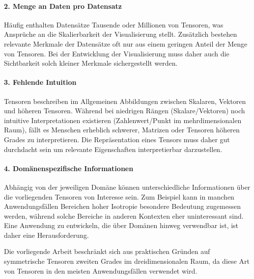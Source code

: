 \documentclass[a4paper,fontsize=12pt,toc=bib,parskip=half,ngerman]{scrartcl}
\begin{document}
\paragraph{2. Menge an Daten pro Datensatz}
H\"aufig enthalten Datens\"atze Tausende oder Millionen von Tensoren, was Anspr\"uche an die Skalierbarkeit der Visualisierung stellt. Zus\"atzlich bestehen relevante Merkmale der Datens\"atze oft nur aus einem geringen Anteil der Menge von Tensoren. Bei der Entwicklung der Visualisierung muss daher auch die Sichtbarkeit solch kleiner Merkmale sichergestellt werden.

\paragraph{3. Fehlende Intuition}
Tensoren beschreiben im Allgemeinen Abbildungen zwischen Skalaren, Vektoren und h\"oheren Tensoren. W\"ahrend bei niedrigen R\"angen (Skalare/Vektoren) noch intuitive Interpretationen existieren (Zahlenwert/Punkt im mehrdimensionalen Raum), f\"allt es Menschen erheblich schwerer, Matrizen oder Tensoren h\"oheren Grades zu interpretieren. Die Repr\"asentation eines Tensors muss daher gut durchdacht sein um relevante Eigenschaften interpretierbar darzustellen.

\paragraph{4. Dom\"anenspezifische Informationen}
Abh\"angig von der jeweiligen Dom\"ane k\"onnen unterschiedliche Informationen \"uber die vorliegenden Tensoren von Interesse sein.  Zum Beispiel kann in manchen Anwendungsf\"allen Bereichen hoher Isotropie besondere Bedeutung zugemessen werden, w\"ahrend solche Bereiche in anderen Kontexten eher uninteressant sind\cite[S.~4]{hlawitschka2014top}. Eine Anwendung zu entwickeln, die \"uber Dom\"anen hinweg verwendbar ist, ist daher eine Herausforderung.

Die vorliegende Arbeit beschr\"ankt sich aus praktischen Gr\"unden auf symmetrische Tensoren zweiten Grades im dreidimensionalen Raum, da diese Art von Tensoren in den meisten Anwendungsf\"allen verwendet wird.
\end{document}
